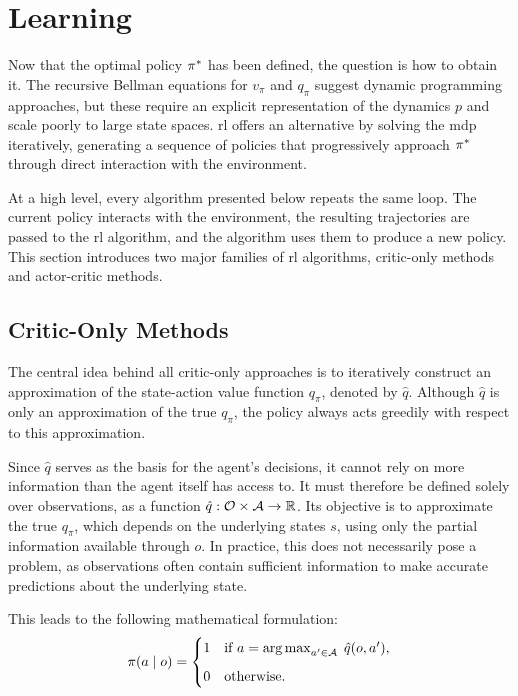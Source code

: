 \section{Learning}
\label{sec:reinforcement_learning_learning}

Now that the optimal policy \(\pi^{*}\) has been defined, the question is how to obtain it.
The recursive Bellman equations for \(v_\pi\) and \(q_\pi\) suggest dynamic programming approaches, but these require an explicit representation of the dynamics \(p\) and scale poorly to large state spaces.
\gls{rl} offers an alternative by solving the \gls{mdp} iteratively, generating a sequence of policies that progressively approach \(\pi^{*}\) through direct interaction with the environment.

At a high level, every algorithm presented below repeats the same loop.
The current policy interacts with the environment, the resulting trajectories are passed to the \gls{rl} algorithm, and the algorithm uses them to produce a new policy.
This section introduces two major families of \gls{rl} algorithms, critic-only methods and actor-critic methods.

\subsection{Critic-Only Methods}
\label{subsec:critic_only}

The central idea behind all critic-only approaches is to iteratively construct an approximation of the state-action value function \(q_\pi\), denoted by \(\hat{q}\).
Although \(\hat{q}\) is only an approximation of the true \(q_\pi\), the policy always acts greedily with respect to this approximation.

Since \(\hat{q}\) serves as the basis for the agent's decisions, it cannot rely on more information than the agent itself has access to.
It must therefore be defined solely over observations, as a function \(\hat{q} : \mathcal{O} \times \mathcal{A} \to \mathbb{R}\).
Its objective is to approximate the true \(q_\pi\), which depends on the underlying states \(s\), using only the partial information available through \(o\).
In practice, this does not necessarily pose a problem, as observations often contain sufficient information to make accurate predictions about the underlying state.

This leads to the following mathematical formulation:
\begin{equation}
    \pi(a \mid o) =
    \begin{cases}
    1 & \text{if } a = \operatorname*{arg\,max}_{a' \in \mathcal{A}}\; \hat{q}(o, a'), \\[6pt]
    0 & \text{otherwise}.
    \end{cases}
    \label{eq:greedy_policy}
\end{equation}

